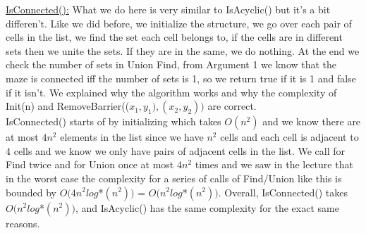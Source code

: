 \documentclass{article}
\begin{document}
\underline{IsConnected():} What we do here is very similar to IsAcyclic() but it's a bit differen't. Like we did before, we initialize the structure, we go over each pair of cells in the list, we find the set each cell belongs to, if the cells are in different sets then we unite the sets. If they are in the same, we do nothing. At the end we check the number of sets in Union Find, from Argument 1 we know that the maze is connected iff the number of sets is 1, so we return true if it is 1 and false if it isn't.
We explained why the algorithm works and why the complexity of Init(n) and RemoveBarrier(($x_1,y_1),(x_2,y_2))$ are correct.\\ IsConnected() starts of by initializing which takes $O(n^2)$ and we know there are at most $4n^2$ elements in the list since we have $n^2$ cells and each cell is adjacent to 4 cells and we know we only have pairs of adjacent cells in the list. We call for Find twice and for Union once at most $4n^2$ times and we saw in the lecture that in the worst case the complexity for a series of calls of Find/Union like this is bounded by $O(4n^2log$*$(n^2))$ = $O(n^2log$*$(n^2))$. Overall, IsConnected() takes $O(n^2log$*$(n^2))$, and IsAcyclic() has the same complexity for the exact same reasons.
\end{document}
